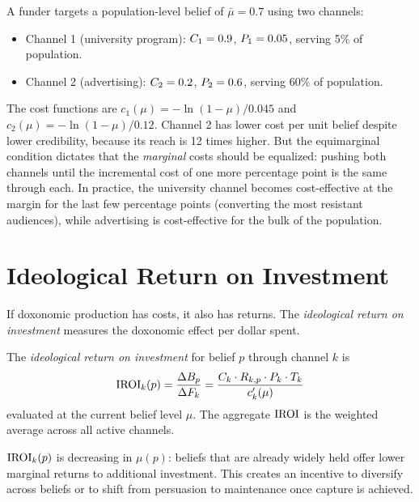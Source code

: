 \begin{example}
\label{ex:cost-comparison}
A funder targets a population-level belief of $\bar{\mu} = 0.7$ using two channels:
\begin{itemize}[nosep]
  \item Channel 1 (university program): $C_{1} = 0.9$, $P_{1} = 0.05$, serving 5\% of population.
  \item Channel 2 (advertising): $C_{2} = 0.2$, $P_{2} = 0.6$, serving 60\% of population.
\end{itemize}
The cost functions are $c_1(\mu) = -\ln(1-\mu)/0.045$ and $c_2(\mu) = -\ln(1-\mu)/0.12$.
Channel 2 has lower cost per unit belief despite lower credibility, because its reach is 12 times higher.
But the equimarginal condition dictates that the \emph{marginal} costs should be equalized: pushing both channels until the incremental cost of one more percentage point is the same through each.
In practice, the university channel becomes cost-effective at the margin for the last few percentage points (converting the most resistant audiences), while advertising is cost-effective for the bulk of the population.
\end{example}


\section{Ideological Return on Investment}
\label{sec:ch10-iroi}

If doxonomic production has costs, it also has returns.
The \emph{ideological return on investment} measures the doxonomic effect per dollar spent.

\begin{definition}
\label{def:iroi}
The \emph{ideological return on investment} for belief $p$ through channel $k$ is
\[
  \mathrm{IROI}_k(p) = \frac{\Delta B_{p}}{\Delta F_{k}} = \frac{C_{k} \cdot R_{k,p} \cdot P_{k} \cdot T_{k}}{c_k'(\mu)}
\]
evaluated at the current belief level $\mu$.
The aggregate $\mathrm{IROI}$ is the weighted average across all active channels.
\end{definition}

\begin{proposition}
\label{prop:decreasing-iroi}
$\mathrm{IROI}_k(p)$ is decreasing in $\mu(p)$: beliefs that are already widely held offer lower marginal returns to additional investment.
This creates an incentive to diversify across beliefs or to shift from persuasion to maintenance once capture is achieved.
\end{proposition}

